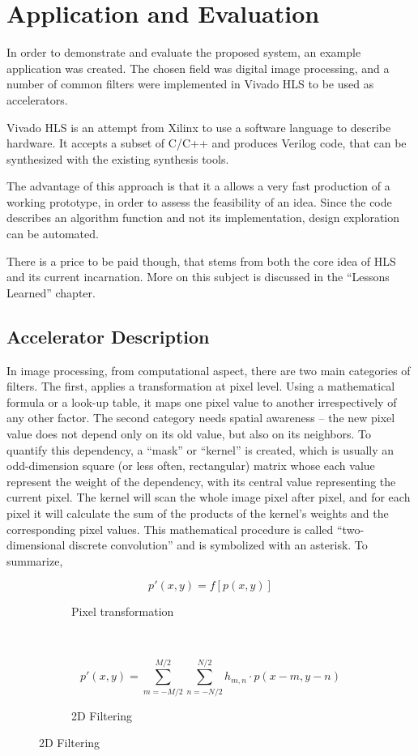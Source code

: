 \chapter{Application and Evaluation}

In order to demonstrate and evaluate the proposed system, an example application was created.
The chosen field was digital image processing, and a number of common filters were implemented
in Vivado HLS to be used as accelerators.

Vivado HLS is an attempt from Xilinx to use a software language to describe hardware.
It accepts a subset of C/C++ and produces Verilog code, that can be synthesized with
the existing synthesis tools.

The advantage of this approach is that it a allows a very fast production of a working
prototype, in order to assess the feasibility of an idea. Since the code describes
an algorithm function and not its implementation, design exploration can be automated.

There is a price to be paid though, that stems from both the core idea of HLS and its
current incarnation. More on this subject is discussed in the ``Lessons Learned'' chapter.

\section{Accelerator Description}

In image processing, from computational aspect, there are two main categories of filters.
The first, applies a transformation at pixel level. Using a mathematical formula or a
look-up table, it maps one pixel value to another irrespectively of any other factor.
The second category needs spatial awareness -- the new pixel value does not depend only
on its old value, but also on its neighbors. To quantify this dependency, a ``mask'' or
``kernel'' is created, which is usually an odd-dimension square (or less often, rectangular)
matrix whose each value represent the weight of the dependency, with its central value
representing the current pixel. The kernel will scan the whole image pixel after pixel,
and for each pixel it will calculate the sum of the products of the kernel's weights
and the corresponding pixel values. This mathematical procedure is called
``two-dimensional discrete convolution'' and is symbolized with an asterisk.
To summarize,

\begin{figure}[H]
\centering
\begin{subfigure}[b]{.3\linewidth}
	\[
		p'(x,y) = f\left[p(x,y) \right]
	\]
	\caption{Pixel transformation}
\end{subfigure}
~\quad
\begin{subfigure}[b]{.6\linewidth}
	\[
		p'(x,y) = \sum_{m = -M/2}^{M/2}{
			\sum_{n = -N/2}^{N/2}{
				{h_{m,n}\cdot p(x - m, y - n)}
			}
		}
	\]
	\caption{2D Filtering}
\end{subfigure}
\end{figure}

